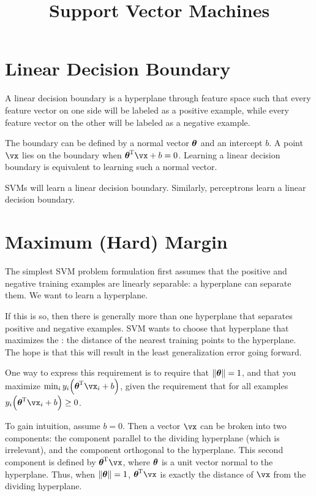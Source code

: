 \documentclass[11pt, oneside]{amsart}
\begin{document}
\title{Support Vector Machines}
\maketitle

\section{Linear Decision Boundary}

A linear decision boundary is a hyperplane through feature space such
that every feature vector on one side will be labeled as a positive
example, while every feature vector on the other will be labeled as a
negative example.

The boundary can be defined by a normal vector $\bm{\mathrm{\theta}}$ and an
intercept $b$. A point $\vx$ lies on the boundary when $\vtheta\tran \vx
+ b = 0$. Learning a linear decision boundary is equivalent to learning
such a normal vector.

SVMs will learn a linear decision boundary. Similarly, perceptrons learn
a linear decision boundary.

\section{Maximum (Hard) Margin}

The simplest SVM problem formulation first assumes that the positive and
negative training examples are linearly separable: a hyperplane can
separate them. We want to learn a hyperplane.

If this is so, then there is generally more than one hyperplane that
separates positive and negative examples. SVM wants to choose that
hyperplane that maximizes the : the distance of the
nearest training points to the hyperplane. The hope is that this will
result in the least generalization error going forward.

One way to express this requirement is to require that $\left\Vert \bm{\mathrm{\theta}} \right\Vert =
1$, and that you maximize $\min_i y_i \parens{\vtheta\tran \vx_i + b}$,
given the requirement that for all examples $y_i \parens{\vtheta\tran
\vx_i + b} \geq 0$.

To gain intuition, assume $b = 0$. Then a vector $\vx$ can be broken
into two components: the component parallel to the dividing hyperplane
(which is irrelevant), and the component orthogonal to the hyperplane.
This second component is defined by $\vtheta\tran \vx$, where $\bm{\mathrm{\theta}}$
is a unit vector normal to the hyperplane. Thus, when $\left\Vert \bm{\mathrm{\theta}} \right\Vert =
1$, $\vtheta\tran \vx$ is exactly the distance of $\vx$ from the
dividing hyperplane.
\end{document}

